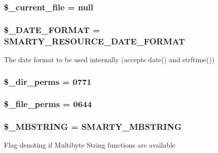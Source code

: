 \subsubsection[{\$\+\_\+current\+\_\+file}]{\setlength{\rightskip}{0pt plus 5cm}\$\+\_\+current\+\_\+file = null}\label{class_smarty_a4c6ef40a0c9534d4c25ec77cd4e8d388}
\hypertarget{class_smarty_a10771c318c1ae4d6178476dbf20dbdda}{}
\subsubsection[{\$\+\_\+\+D\+A\+T\+E\+\_\+\+F\+O\+R\+M\+A\+T}]{\setlength{\rightskip}{0pt plus 5cm}\$\+\_\+\+D\+A\+T\+E\+\_\+\+F\+O\+R\+M\+A\+T = S\+M\+A\+R\+T\+Y\+\_\+\+R\+E\+S\+O\+U\+R\+C\+E\+\_\+\+D\+A\+T\+E\+\_\+\+F\+O\+R\+M\+A\+T\hspace{0.3cm}{\ttfamily [static]}}\label{class_smarty_a10771c318c1ae4d6178476dbf20dbdda}
The date format to be used internally (accepts date() and strftime()) \hypertarget{class_smarty_a917cec287e9c00b1c188e4a815b279b2}{}
\subsubsection[{\$\+\_\+dir\+\_\+perms}]{\setlength{\rightskip}{0pt plus 5cm}\$\+\_\+dir\+\_\+perms = 0771}\label{class_smarty_a917cec287e9c00b1c188e4a815b279b2}
\hypertarget{class_smarty_affa1e29315f40fe30ea516c7e8f2430e}{}
\subsubsection[{\$\+\_\+file\+\_\+perms}]{\setlength{\rightskip}{0pt plus 5cm}\$\+\_\+file\+\_\+perms = 0644}\label{class_smarty_affa1e29315f40fe30ea516c7e8f2430e}
\hypertarget{class_smarty_a5a41ec0fc4477ef639ba3cf063816114}{}
\subsubsection[{\$\+\_\+\+M\+B\+S\+T\+R\+I\+N\+G}]{\setlength{\rightskip}{0pt plus 5cm}\$\+\_\+\+M\+B\+S\+T\+R\+I\+N\+G = S\+M\+A\+R\+T\+Y\+\_\+\+M\+B\+S\+T\+R\+I\+N\+G\hspace{0.3cm}{\ttfamily [static]}}\label{class_smarty_a5a41ec0fc4477ef639ba3cf063816114}
Flag denoting if Multibyte String functions are available \hypertarget{class_smarty_abb10f08cd280a1b7e1b2e6cb6afc460c}{}
